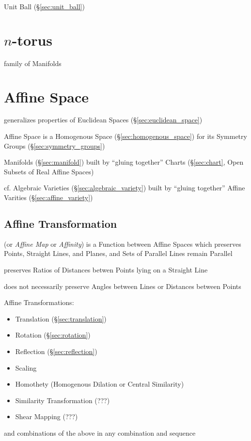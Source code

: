 Unit Ball (\S\ref{sec:unit_ball})



\section{$n$-torus}\label{sec:n_torus}

family of Manifolds



\section{Affine Space}\label{sec:affine_space}


generalizes properties of Euclidean Spaces (\S\ref{sec:euclidean_space})

Affine Space is a Homogenous Space (\S\ref{sec:homogenous_space}) for its
Symmetry Groups (\S\ref{sec:symmetry_groups})

Manifolds (\S\ref{sec:manifold}) built by ``gluing together'' Charts
(\S\ref{sec:chart}, Open Subsets of Real Affine Spaces)

cf. Algebraic Varieties (\S\ref{sec:algebraic_variety}) built by ``gluing
together'' Affine Varities (\S\ref{sec:affine_variety})



\subsection{Affine Transformation}\label{sec:affine_transformation}

(or \emph{Affine Map} or \emph{Affinity}) is a Function between Affine
Spaces which preserves Points, Straight Lines, and Planes, and Sets of
Parallel Lines remain Parallel

preserves Ratios of Distances betwen Points lying on a Straight Line

does not necessarily preserve Angles between Lines or Distances
between Points

Affine Transformations:
\begin{itemize}
\item Translation (\S\ref{sec:translation})
\item Rotation (\S\ref{sec:rotation})
\item Reflection (\S\ref{sec:reflection})
\item Scaling
\item Homothety (Homogenous Dilation or Central Similarity)
\item Similarity Transformation (???)
\item Shear Mapping (???)
\end{itemize}
and combinations of the above in any combination and sequence

